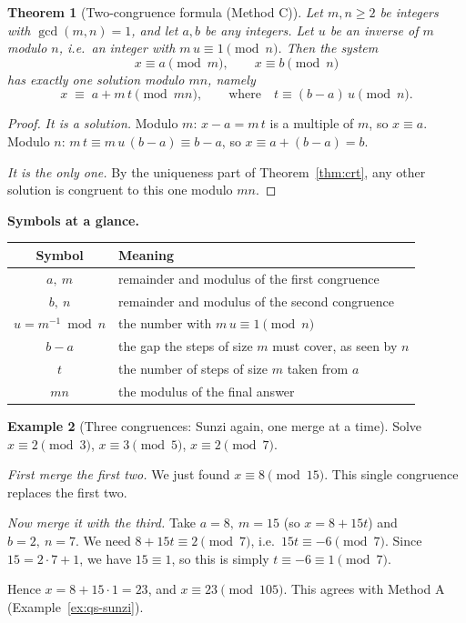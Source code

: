 \documentclass[11pt]{article}
\newtheorem{theorem}{Theorem}[section]
\theoremstyle{definition}
\newtheorem{example}[theorem]{Example}
\theoremstyle{remark}
\newcommand{\minorhead}[1]{\par\medskip\noindent{\large\bfseries\itshape #1}\par\nopagebreak\smallskip}
\begin{document}
\minorhead{The formula, stated formally}

\begin{theorem}[Two-congruence formula (Method C)]\label{thm:methodC}
Let $m,n\ge 2$ be integers with $\gcd(m,n)=1$, and let $a,b$ be any integers. Let $u$ be an inverse of $m$ modulo $n$, i.e.\ an integer with $m\,u\equiv1\pmod n$. Then the system
\[
x\equiv a\pmod m,\qquad x\equiv b\pmod n
\]
has exactly one solution modulo $mn$, namely
\[
\boxed{\;x\;\equiv\;a+m\,t \pmod{mn},\qquad\text{where}\quad t\equiv (b-a)\,u \pmod n.\;}
\]
\end{theorem}

\begin{proof}
\emph{It is a solution.} Modulo $m$: $x-a=m\,t$ is a multiple of $m$, so $x\equiv a$. Modulo $n$: $m\,t\equiv m\,u\,(b-a)\equiv b-a$, so $x\equiv a+(b-a)=b$.

\emph{It is the only one.} By the uniqueness part of Theorem~\ref{thm:crt}, any other solution is congruent to this one modulo $mn$.
\end{proof}

\noindent\textbf{Symbols at a glance.}
\begin{center}
\renewcommand{\arraystretch}{1.3}
\begin{tabular}{cl}
\toprule
Symbol & Meaning \\
\midrule
$a,\ m$ & remainder and modulus of the first congruence \\
$b,\ n$ & remainder and modulus of the second congruence \\
$u=m^{-1}\bmod n$ & the number with $m\,u\equiv1\pmod n$ \\
$b-a$ & the gap the steps of size $m$ must cover, as seen by $n$ \\
$t$ & the number of steps of size $m$ taken from $a$ \\
$mn$ & the modulus of the final answer \\
\bottomrule
\end{tabular}
\end{center}

\begin{example}[Three congruences: Sunzi again, one merge at a time]\label{ex:sunzi-C}
Solve $x\equiv2\pmod3$, $x\equiv3\pmod5$, $x\equiv2\pmod7$.

\emph{First merge the first two.} We just found $x\equiv8\pmod{15}$. This single congruence replaces the first two.

\emph{Now merge it with the third.} Take $a=8,\ m=15$ (so $x=8+15t$) and $b=2,\ n=7$. We need $8+15t\equiv2\pmod 7$, i.e.\ $15t\equiv-6\pmod7$. Since $15=2\cdot7+1$, we have $15\equiv1$, so this is simply $t\equiv-6\equiv1\pmod7$.

Hence $x=8+15\cdot1=23$, and $x\equiv23\pmod{105}$. This agrees with Method A (Example~\ref{ex:qs-sunzi}).
\end{example}
\end{document}
